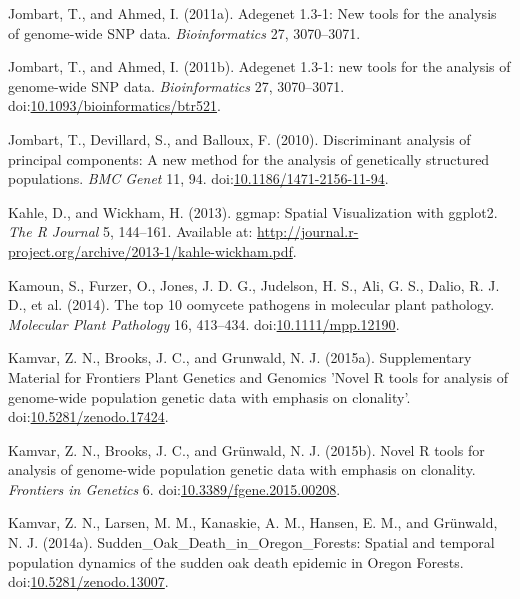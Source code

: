 \documentclass[double,12pt]{beavtex}
\begin{document}
  \hypertarget{ref-jombart2011adegenet}{}
  Jombart, T., and Ahmed, I. (2011a). Adegenet 1.3-1: New tools for the
  analysis of genome-wide SNP data. \emph{Bioinformatics} 27, 3070--3071.
  
  \hypertarget{ref-Jombart:2011}{}
  Jombart, T., and Ahmed, I. (2011b). Adegenet 1.3-1: new tools for the
  analysis of genome-wide SNP data. \emph{Bioinformatics} 27, 3070--3071.
  doi:\href{https://doi.org/10.1093/bioinformatics/btr521}{10.1093/bioinformatics/btr521}.
  
  \hypertarget{ref-jombart2010discriminant}{}
  Jombart, T., Devillard, S., and Balloux, F. (2010). Discriminant
  analysis of principal components: A new method for the analysis of
  genetically structured populations. \emph{BMC Genet} 11, 94.
  doi:\href{https://doi.org/10.1186/1471-2156-11-94}{10.1186/1471-2156-11-94}.
  
  \hypertarget{ref-khale2013ggmap}{}
  Kahle, D., and Wickham, H. (2013). ggmap: Spatial Visualization with
  ggplot2. \emph{The R Journal} 5, 144--161. Available at:
  \url{http://journal.r-project.org/archive/2013-1/kahle-wickham.pdf}.
  
  \hypertarget{ref-kamoun2014top}{}
  Kamoun, S., Furzer, O., Jones, J. D. G., Judelson, H. S., Ali, G. S.,
  Dalio, R. J. D., et al. (2014). The top 10 oomycete pathogens in
  molecular plant pathology. \emph{Molecular Plant Pathology} 16,
  413--434.
  doi:\href{https://doi.org/10.1111/mpp.12190}{10.1111/mpp.12190}.
  
  \hypertarget{ref-kamvar2015poppr2supp}{}
  Kamvar, Z. N., Brooks, J. C., and Grunwald, N. J. (2015a). Supplementary
  Material for Frontiers Plant Genetics and Genomics 'Novel R tools for
  analysis of genome-wide population genetic data with emphasis on
  clonality'.
  doi:\href{https://doi.org/10.5281/zenodo.17424}{10.5281/zenodo.17424}.
  
  \hypertarget{ref-kamvar2015novel}{}
  Kamvar, Z. N., Brooks, J. C., and Grünwald, N. J. (2015b). Novel R tools
  for analysis of genome-wide population genetic data with emphasis on
  clonality. \emph{Frontiers in Genetics} 6.
  doi:\href{https://doi.org/10.3389/fgene.2015.00208}{10.3389/fgene.2015.00208}.
  
  \hypertarget{ref-kamvar2014sudden}{}
  Kamvar, Z. N., Larsen, M. M., Kanaskie, A. M., Hansen, E. M., and
  Grünwald, N. J. (2014a). Sudden\_Oak\_Death\_in\_Oregon\_Forests:
  Spatial and temporal population dynamics of the sudden oak death
  epidemic in Oregon Forests.
  doi:\href{https://doi.org/10.5281/zenodo.13007}{10.5281/zenodo.13007}.
  
\end{document}
